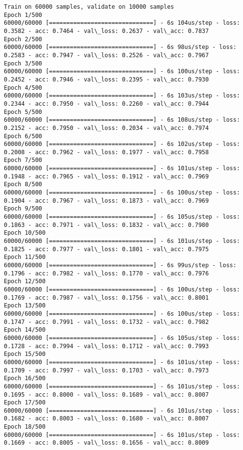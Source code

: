 \documentclass[11pt]{article}
\begin{document}
    \begin{Verbatim}[commandchars=\\\{\}]
Train on 60000 samples, validate on 10000 samples
Epoch 1/500
60000/60000 [==============================] - 6s 104us/step - loss: 0.3582 - acc: 0.7464 - val\_loss: 0.2637 - val\_acc: 0.7837
Epoch 2/500
60000/60000 [==============================] - 6s 98us/step - loss: 0.2583 - acc: 0.7947 - val\_loss: 0.2526 - val\_acc: 0.7967
Epoch 3/500
60000/60000 [==============================] - 6s 100us/step - loss: 0.2452 - acc: 0.7946 - val\_loss: 0.2395 - val\_acc: 0.7930
Epoch 4/500
60000/60000 [==============================] - 6s 103us/step - loss: 0.2344 - acc: 0.7950 - val\_loss: 0.2260 - val\_acc: 0.7944
Epoch 5/500
60000/60000 [==============================] - 6s 108us/step - loss: 0.2152 - acc: 0.7950 - val\_loss: 0.2034 - val\_acc: 0.7974
Epoch 6/500
60000/60000 [==============================] - 6s 102us/step - loss: 0.2008 - acc: 0.7962 - val\_loss: 0.1977 - val\_acc: 0.7958
Epoch 7/500
60000/60000 [==============================] - 6s 101us/step - loss: 0.1948 - acc: 0.7965 - val\_loss: 0.1912 - val\_acc: 0.7969
Epoch 8/500
60000/60000 [==============================] - 6s 100us/step - loss: 0.1904 - acc: 0.7967 - val\_loss: 0.1873 - val\_acc: 0.7969
Epoch 9/500
60000/60000 [==============================] - 6s 105us/step - loss: 0.1863 - acc: 0.7971 - val\_loss: 0.1832 - val\_acc: 0.7980
Epoch 10/500
60000/60000 [==============================] - 6s 101us/step - loss: 0.1825 - acc: 0.7977 - val\_loss: 0.1801 - val\_acc: 0.7975
Epoch 11/500
60000/60000 [==============================] - 6s 99us/step - loss: 0.1796 - acc: 0.7982 - val\_loss: 0.1770 - val\_acc: 0.7976
Epoch 12/500
60000/60000 [==============================] - 6s 100us/step - loss: 0.1769 - acc: 0.7987 - val\_loss: 0.1756 - val\_acc: 0.8001
Epoch 13/500
60000/60000 [==============================] - 6s 100us/step - loss: 0.1747 - acc: 0.7991 - val\_loss: 0.1732 - val\_acc: 0.7982
Epoch 14/500
60000/60000 [==============================] - 6s 105us/step - loss: 0.1728 - acc: 0.7994 - val\_loss: 0.1712 - val\_acc: 0.7993
Epoch 15/500
60000/60000 [==============================] - 6s 101us/step - loss: 0.1709 - acc: 0.7997 - val\_loss: 0.1703 - val\_acc: 0.7973
Epoch 16/500
60000/60000 [==============================] - 6s 101us/step - loss: 0.1695 - acc: 0.8000 - val\_loss: 0.1689 - val\_acc: 0.8007
Epoch 17/500
60000/60000 [==============================] - 6s 101us/step - loss: 0.1682 - acc: 0.8003 - val\_loss: 0.1680 - val\_acc: 0.8007
Epoch 18/500
60000/60000 [==============================] - 6s 101us/step - loss: 0.1669 - acc: 0.8005 - val\_loss: 0.1656 - val\_acc: 0.8009

\end{Verbatim}
\end{document}
